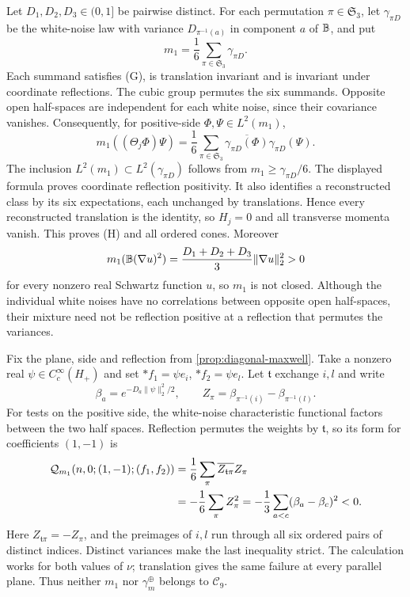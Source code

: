 \documentclass[11pt,letterpaper,reqno]{amsart}
\theoremstyle{definition}
\theoremstyle{remark}
\begin{document}
Let $D_1,D_2,D_3\in(0,1]$ be pairwise distinct. For each permutation
$\pi\in\mathfrak S_3$, let $\gamma_{\pi D}$ be the white-noise law
with variance $D_{\pi^{-1}(a)}$ in component $a$ of $\mathbb B$, and put
\[
 m_1=\frac16\sum_{\pi\in\mathfrak S_3}\gamma_{\pi D}.
\]
Each summand satisfies (G), is translation invariant and is
invariant under coordinate reflections. The cubic group permutes
the six summands. Opposite open half-spaces are independent for
each white noise, since their covariance vanishes. Consequently,
for positive-side $\Phi,\Psi\in L^2(m_1)$,
\[
 m_1((\Theta_j\Phi)\Psi)
 =\frac16\sum_{\pi\in\mathfrak S_3}
       \overline{\gamma_{\pi D}(\Phi)}\gamma_{\pi D}(\Psi).
\]
The inclusion $L^2(m_1)\subset L^2(\gamma_{\pi D})$ follows from
$m_1\ge\gamma_{\pi D}/6$. The displayed formula proves coordinate
reflection positivity. It also identifies a reconstructed class
by its six expectations, each unchanged by translations.
Hence every reconstructed translation is the identity, so
$H_j=0$ and all transverse momenta vanish. This proves (H) and
all ordered cones. Moreover
\[
 m_1(\mathbb B(\nabla u)^2)
   =\frac{D_1+D_2+D_3}{3}\|\nabla u\|_2^2>0
\]
for every nonzero real Schwartz function $u$, so $m_1$ is not closed.
Although the individual white noises have no correlations between
opposite open half-spaces, their mixture need not be reflection
positive at a reflection that permutes the variances.

Fix the plane, side and reflection from
\cref{prop:diagonal-maxwell}. Take a nonzero real
$\psi\in C_c^\infty(H_+)$ and set $*f_1=\psi e_i$,
$*f_2=\psi e_l$. Let $\mathfrak t$ exchange $i,l$ and write
\[
 \beta_a=e^{-D_a\|\psi\|_2^2/2},\qquad
 Z_\pi=\beta_{\pi^{-1}(i)}-\beta_{\pi^{-1}(l)}.
\]
For tests on the positive side, the white-noise characteristic
functional factors between the two half spaces. Reflection permutes
the weights by $\mathfrak t$, so its form for coefficients $(1,-1)$
is
\begin{align}
 \mathcal Q_{m_1}(n,0;(1,-1);(f_1,f_2))
 &=\frac16\sum_\pi\overline{Z_{\mathfrak t\pi}}Z_\pi\notag\\
 &=-\frac16\sum_\pi Z_\pi^2
  =-\frac13\sum_{a<c}(\beta_a-\beta_c)^2<0.
 \label{eq:mixture-negative}
\end{align}
Here $Z_{\mathfrak t\pi}=-Z_\pi$, and the preimages of $i,l$ run
through all six ordered pairs of distinct indices. Distinct variances
make the last inequality strict. The calculation works for both
values of $\nu$; translation gives the same failure at every parallel
plane. Thus neither $m_1$ nor $\gamma_m^\oplus$ belongs to
$\mathcal C_9$.
\end{document}
